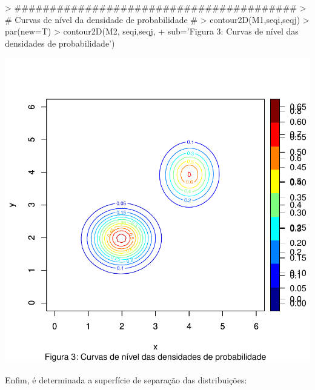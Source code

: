 \documentclass{article}
\begin{document}
\begin{Schunk}
\begin{Sinput}
> ########################################
> # Curvas de nível da densidade de probabilidade #
> contour2D(M1,seqi,seqj)
> par(new=T)
> contour2D(M2, seqi,seqj,
+           sub='Figura 3: Curvas de nível das densidades de probabilidade')
\end{Sinput}
\end{Schunk}
\includegraphics{gaussr2-004}

Enfim, é determinada a superfície de separação das distribuições:
\end{document}
